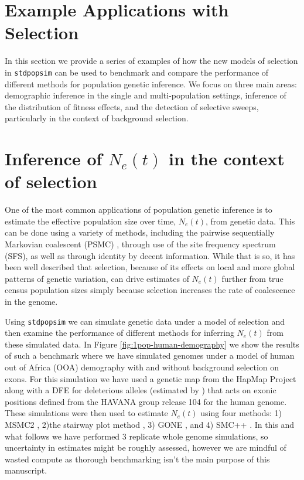 \documentclass[hidelinks]{article}
\newcommand{\stdpopsim}{\texttt{stdpopsim}\xspace}
\begin{document}
    
\section*{Example Applications with Selection}
    \label{applications}
    In this section we provide a series of examples of how the new models of selection
    in \stdpopsim can be used to benchmark and compare the performance of different
    methods for population genetic inference.
    We focus on three main areas: demographic inference in the 
    single and multi-population settings, inference of the distribution of fitness effects,
    and the detection of selective sweeps, particularly in the context of background selection.

    \section*{Inference of $N_e(t)$ in the context of selection}
    One of the most common applications of population genetic inference is to estimate
    the effective population size over time, $N_e(t)$, from genetic data. This can be done
    using a variety of methods, including the pairwise sequentially Markovian coalescent
    (PSMC) \citep{li2011inference}, through use of the site frequency spectrum (SFS),
    as well as through identity by decent information. 
    While that is so, it has been well described that selection, because of its effects on
    local and more global patterns of genetic variation, can drive estimates of $N_e(t)$
    further from true census population sizes simply because selection increases the 
    rate of coalescence in the genome. 

    Using \stdpopsim we can simulate genetic data under a model of selection and then 
    examine the performance of different methods for inferring $N_e(t)$ from these simulated 
    data. In Figure \ref{fig:1pop-human-demography} we show the results of such a benchmark
    where we have simulated genomes under a model of human out of Africa (OOA) demography
    with and without background selection on exons. For this simulation we have used
    a genetic map from the HapMap Project \citep{international2007second} along with a
    DFE for deleterious alleles (estimated by \cite{huber2017determining})
    that acts on exonic positions defined from the HAVANA group release 104 for the human genome. 
    These simulations were then used to estimate $N_e(t)$ using four methods: 1) MSMC2 \citep{Schiffels2020}, 
    2)the stairway plot method \citep{liu2020stairway}, 3) GONE \citep{santiago2020recent}, and 4) SMC++ \citep{terhorst2017robust}.
    In this and what follows we have performed 3 replicate whole genome simulations, so uncertainty in estimates might
    be roughly assessed, however we are mindful of wasted compute as thorough benchmarking
    isn't the main purpose of this manuscript.
    
\end{document}
